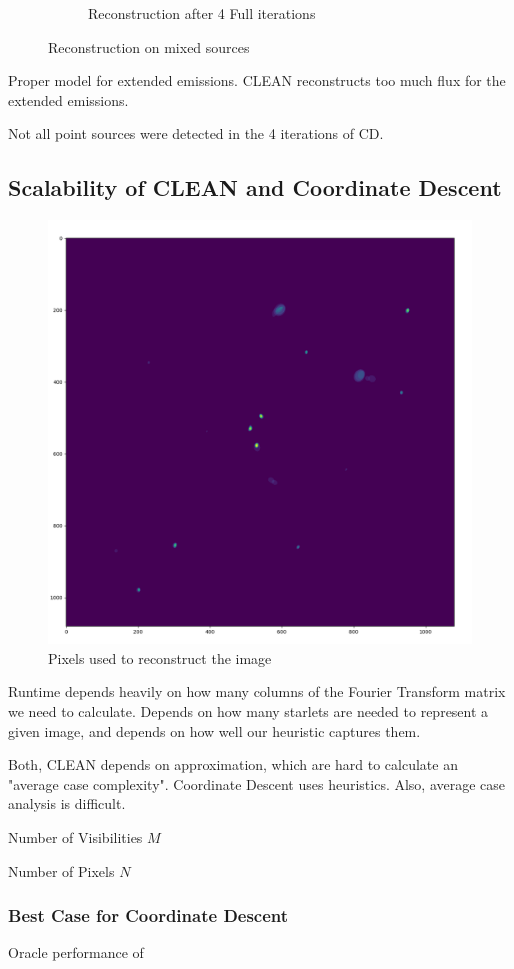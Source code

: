 \begin{figure}[h]
\begin{subfigure}[b]{0.45\linewidth}
		\caption{Reconstruction after 4 Full iterations}
		\label{results:g55:nrao:dirty}
	\end{subfigure}
	\caption{Reconstruction on mixed sources}
	\label{results:mixed}
\end{figure}

Proper model for extended emissions. CLEAN reconstructs too much flux for the extended emissions.

Not all point sources were detected in the 4 iterations of CD.



\subsection{Scalability of CLEAN and Coordinate Descent}


\begin{figure}[h]
	\centering
	\includegraphics[width=0.5\linewidth]{./chapters/05.algorithms/sim00/full_cache_debug.png}
	\caption{Pixels used to reconstruct the image}
	\label{results:pixels:used}
\end{figure}
Runtime depends heavily on how many columns of the Fourier Transform matrix we need to calculate. Depends on how many starlets are needed to represent a given image, and depends on how well our heuristic captures them. 

Both, CLEAN depends on approximation, which are hard to calculate an "average case complexity". 
Coordinate Descent uses heuristics. Also, average case analysis is difficult. 

Number of Visibilities $M$

Number of Pixels $N$

\subsubsection{Best Case for Coordinate Descent}
Oracle performance of 

